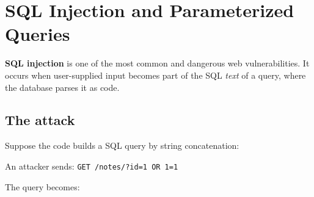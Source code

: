 \setcounter{section}{4}
\section{SQL Injection and Parameterized Queries}\label{31-input-handling:315-sql-injection-and-parameterized-queries}

\textbf{SQL injection} is one of the most common and dangerous web vulnerabilities. It occurs when user-supplied input becomes part of the SQL \emph{text} of a query, where the database parses it as code.

\subsection*{The attack}\label{31-input-handling:the-attack}

Suppose the code builds a SQL query by string concatenation:

\begin{codebox}[short]

\begin{Shaded}
\begin{Highlighting}[]
\OperatorTok{=}\NormalTok{)}
\OperatorTok{=} \SpecialCharTok{\{}\SpecialCharTok{\}}
\end{Highlighting}
\end{Shaded}

\end{codebox}

\noindent{}An attacker sends: \texttt{GET\ /}\allowbreak{}\texttt{notes/}\allowbreak{}\texttt{?}\allowbreak{}\texttt{id=}\allowbreak{}\texttt{1\ OR\ 1=}\allowbreak{}\texttt{1}

The query becomes:

\begin{codebox}[short]

\begin{Shaded}
\begin{Highlighting}[]
 \OperatorTok{*}   \OperatorTok{=}   \OperatorTok{=}
\end{Highlighting}
\end{Shaded}

\end{codebox}

